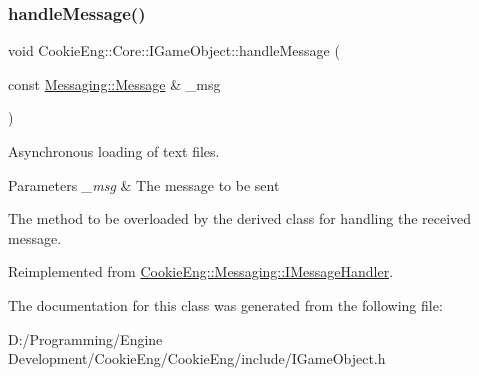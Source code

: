 \subsubsection{\texorpdfstring{handle\+Message()}{handleMessage()}}
{\footnotesize\ttfamily void Cookie\+Eng\+::\+Core\+::\+I\+Game\+Object\+::handle\+Message (\begin{DoxyParamCaption}\item[{const \hyperlink{class_cookie_eng_1_1_messaging_1_1_message}{Messaging\+::\+Message} \&}]{\+\_\+msg }\end{DoxyParamCaption})\hspace{0.3cm}{\ttfamily [virtual]}}



Asynchronous loading of text files. 


\begin{DoxyParams}{Parameters}
{\em \+\_\+msg} & The message to be sent\\
\hline
\end{DoxyParams}
The method to be overloaded by the derived class for handling the received message. 

Reimplemented from \hyperlink{class_cookie_eng_1_1_messaging_1_1_i_message_handler_a4da863b449970f8195d3c60c83c6d183}{Cookie\+Eng\+::\+Messaging\+::\+I\+Message\+Handler}.



The documentation for this class was generated from the following file\+:\begin{DoxyCompactItemize}
\item 
D\+:/\+Programming/\+Engine Development/\+Cookie\+Eng/\+Cookie\+Eng/include/I\+Game\+Object.\+h\end{DoxyCompactItemize}
